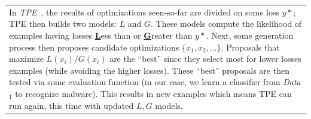 \begin{table}[!b]
\small
\begin{tabular}{|p{.99\linewidth}|}\hline
\rowcolor{blue!10}
In \textit{TPE}~\cite{bergstra2011algorithms},
the results of optimizations seen-so-far are divided on some loss  $y*$; TPE then builds two models: $L$ and $G$. These  models compute the likelihood of examples  having losses \underline{{\bf L}}ess than or \underline{{\bf G}}reater than $y*$. Next, some generation process then proposes candidate optimizations $\{x_1,x_2,...\}$. Proposals that maximize ${L(x_i)/G(x_i)}$ are the ``best'' since they select most for lower losses examples (while avoiding the higher losses). These ``best'' proposals are then tested via some evaluation function (in our case, we learn a classifier from {\em Data$_1$} to recognize malware). This results in new examples which means TPE can run again, this time with updated $L,G$ models.\\


\end{tabular}
\end{table}
